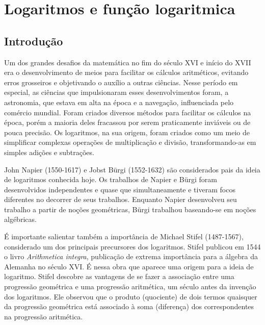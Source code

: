 
\chapter{Logaritmos e função logaritmica}
\section{Introdução}

Um dos grandes desafios da matemática no fim do século XVI e início do XVII era o desenvolvimento de meios para facilitar os cálculos aritméticos, evitando erros grosseiros e objetivando o auxílio a outras ciências. Nesse período em especial, as ciências que impulsionaram esses desenvolvimentos foram, a astronomia, que estava em alta na época e a navegação, influenciada pelo comércio mundial. Foram criados diversos métodos para facilitar os cálculos na época, porém a maioria deles fracassou por serem praticamente inviáveis ou de pouca precisão. Os logaritmos, na sua origem, foram criados como um meio de simplificar complexas operações de multiplicação e divisão, transformando-as em simples adições e subtrações.

John Napier (1550-1617) e Jobst Bürgi (1552-1632) são considerados pais da ideia de logaritmos conhecida hoje. Os trabalhos de Napier e Bürgi foram desenvolvidos independentes e quase que simultaneamente e tiveram focos diferentes no decorrer de seus trabalhos. Enquanto Napier desenvolveu seu trabalho a partir de noções geométricas, Bürgi trabalhou baseando-se em noções algébricas. 

É importante salientar também a importância de Michael Stifel (1487-1567), considerado um dos principais precursores dos logaritmos. Stifel publicou em 1544 o livro \textit{Arithmetica integra}, publicação de extrema importância para a álgebra da Alemanha no século XVI. É nessa obra que aparece uma origem para a ideia de logaritmo. Stifel descobre as vantagens de se fazer a associação entre uma progressão geométrica e uma progressão aritmética, um século antes da invenção dos logaritmos. Ele observou que o produto (quociente) de dois termos quaisquer da progressão geométrica está associado à soma (diferença) dos correspondentes na progressão aritmética.

